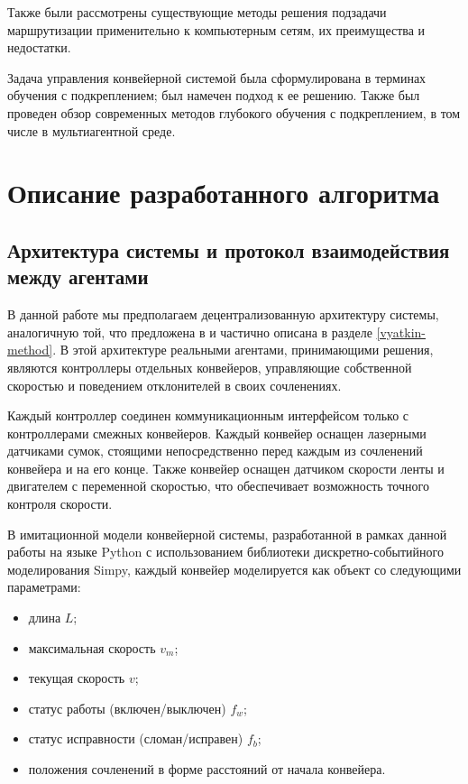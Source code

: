 \documentclass[specification,annotation,times]{itmo-student-thesis}
\theoremstyle{definition}
\begin{document}
Также были рассмотрены существующие методы решения подзадачи маршрутизации
применительно к компьютерным сетям, их преимущества и недостатки.

Задача управления конвейерной системой была сформулирована в терминах обучения с
подкреплением; был намечен подход к ее решению. Также был проведен обзор
современных методов глубокого обучения с подкреплением, в том числе в
мультиагентной среде.

\finishrelatedwork

\chapter{Описание разработанного алгоритма}\label{chapter-algorithm}

\section{Архитектура системы и протокол взаимодействия между агентами}\label{system-arch}

В данной работе мы предполагаем децентрализованную архитектуру системы,
аналогичную той, что предложена в \cite{black2009intelligent,
  vyatkin-controllers} и частично описана в разделе \ref{vyatkin-method}. В
этой архитектуре реальными агентами, принимающими решения, являются контроллеры
отдельных конвейеров, управляющие собственной скоростью и поведением
отклонителей в своих сочленениях.

Каждый контроллер соединен коммуникационным интерфейсом только с контроллерами
смежных конвейеров. Каждый конвейер оснащен лазерными датчиками сумок, стоящими
непосредственно перед каждым из сочленений конвейера и на его конце. Также
конвейер оснащен датчиком скорости ленты и двигателем с переменной скоростью,
что обеспечивает возможность точного контроля скорости.

В имитационной модели конвейерной системы, разработанной в рамках данной работы
\cite{dqnroute-github} на языке Python с использованием библиотеки
дискретно-событийного моделирования Simpy, каждый конвейер моделируется как
объект со следующими параметрами:

\begin{itemize}
\item длина $L$;
\item максимальная скорость $v_m$;
\item текущая скорость $v$;
\item статус работы (включен/выключен) $f_w$;
\item статус исправности (сломан/исправен) $f_b$;
\item положения сочленений в форме расстояний от начала конвейера.
\end{itemize}
\end{document}
